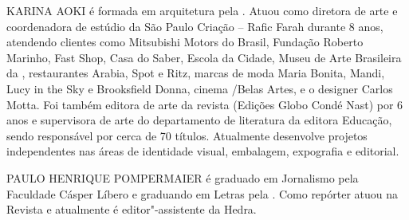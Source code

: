 \medskip

\noindent{}KARINA AOKI é formada em arquitetura pela . Atuou como diretora de arte e coordenadora de estúdio da São Paulo Criação – Rafic Farah
durante 8 anos, atendendo clientes como Mitsubishi Motors do Brasil,
Fundação Roberto Marinho, Fast Shop, Casa do Saber, Escola da Cidade,
Museu de Arte Brasileira da , restaurantes Arabia, Spot e Ritz,
marcas de moda Maria Bonita, Mandi, Lucy in the Sky e Brooksfield Donna,
cinema /Belas Artes, e o designer Carlos Motta. Foi também editora
de arte da revista {} (Edições Globo Condé Nast) por 6 anos e
supervisora de arte do departamento de literatura da editora 
Educação, sendo responsável por cerca de 70 títulos. Atualmente
desenvolve projetos independentes nas áreas de identidade visual,
embalagem, expografia e editorial.

\medskip

\noindent{}PAULO HENRIQUE POMPERMAIER é graduado em Jornalismo pela Faculdade Cásper Líbero e graduando em Letras pela . Como repórter atuou na Revista {} e atualmente é editor"-assistente da Hedra.

\afterpage{\blankpage}

\newpage
\pagestyle{empty}
\MyriadPro

